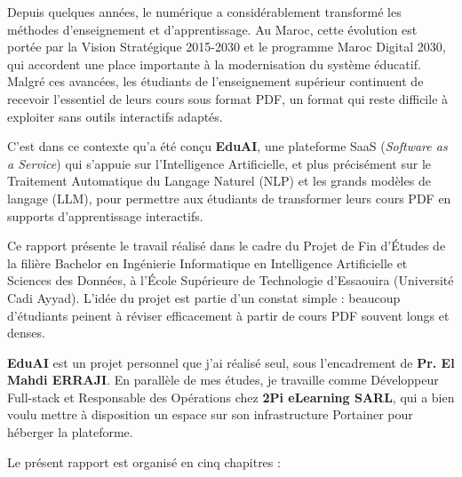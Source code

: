 
Depuis quelques années, le numérique a considérablement transformé les méthodes d'enseignement et d'apprentissage. Au Maroc, cette évolution est portée par la Vision Stratégique 2015-2030 et le programme Maroc Digital 2030, qui accordent une place importante à la modernisation du système éducatif. Malgré ces avancées, les étudiants de l'enseignement supérieur continuent de recevoir l'essentiel de leurs cours sous format PDF, un format qui reste difficile à exploiter sans outils interactifs adaptés.

C'est dans ce contexte qu'a été conçu \textbf{EduAI}, une plateforme SaaS (\textit{Software as a Service}) qui s'appuie sur l'Intelligence Artificielle, et plus précisément sur le Traitement Automatique du Langage Naturel (NLP) et les grands modèles de langage (LLM), pour permettre aux étudiants de transformer leurs cours PDF en supports d'apprentissage interactifs.

Ce rapport présente le travail réalisé dans le cadre du Projet de Fin d'Études de la filière Bachelor en Ingénierie Informatique en Intelligence Artificielle et Sciences des Données, à l'École Supérieure de Technologie d'Essaouira (Université Cadi Ayyad). L'idée du projet est partie d'un constat simple : beaucoup d'étudiants peinent à réviser efficacement à partir de cours PDF souvent longs et denses.

\textbf{EduAI} est un projet personnel que j'ai réalisé seul, sous l'encadrement de \textbf{Pr. El Mahdi ERRAJI}. En parallèle de mes études, je travaille comme Développeur Full-stack et Responsable des Opérations chez \textbf{2Pi eLearning SARL}, qui a bien voulu mettre à disposition un espace sur son infrastructure Portainer pour héberger la plateforme.

\vspace{0.5cm}
Le présent rapport est organisé en cinq chapitres :

